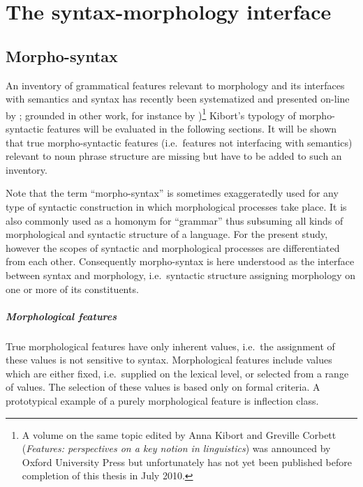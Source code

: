\chapter{The syntax-morphology interface} \label{syntax-morphology-interface}

\section{Morpho-syntax}
An inventory of grammatical features relevant to morphology and its interfaces with semantics and syntax has recently been systematized and presented on-line by \textcite{kibort2008a}; grounded in other work, for instance by \textcite{aronoff1994,corbett1987,carstairs-mccarthy1999,corbett2006,corbett-etal2006,bickel-etal2007})\footnote{A volume on the same topic edited by Anna Kibort and Greville Corbett (\emph{Features: perspectives on a key notion in linguistics}) was announced by Oxford University Press but unfortunately has not yet been published before completion of this thesis in July 2010.} Kibort's typology of morpho-syntactic features will be evaluated in the following sections. It will be shown that true morpho-syntactic features (i.e.~features not interfacing with semantics) relevant to noun phrase structure are missing but have to be added to such an inventory.

Note that the term “morpho-syntax” is sometimes exaggeratedly used for any type of syntactic construction in which morphological processes take place. It is also commonly used as a homonym for “grammar” thus subsuming all kinds of morphological and syntactic structure of a language. For the present study, however the scopes of syntactic and morphological processes are differentiated from each other. Consequently morpho-syntax is here understood as the interface between syntax and morphology, i.e.~syntactic structure assigning morphology on one or more of its constituents.
\paragraph{Morphological features} True morphological features have only inherent values, i.e.~the assignment of these values is not sensitive to syntax. Morphological features include values which are either fixed, i.e.~supplied on the lexical level, or selected from a range of values. The selection of these values is based only on formal criteria. A prototypical example of a purely morphological feature is inflection class.

